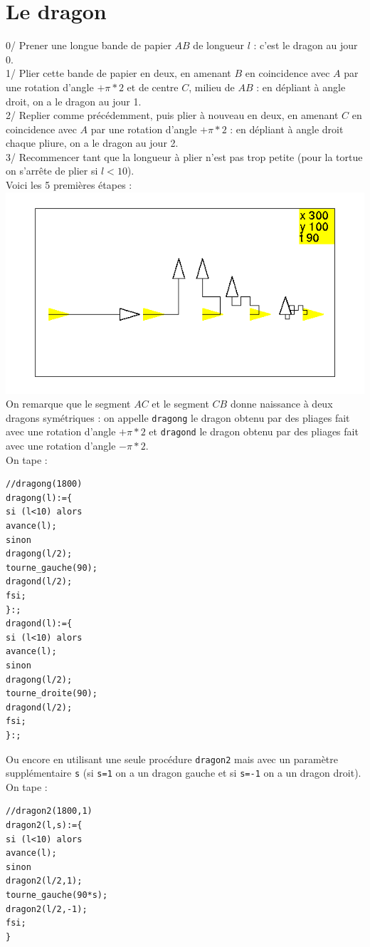 \documentclass[a4paper,11pt]{book}
\begin{document}
\section{Le dragon}
0/ Prener une longue bande de papier $AB$ de longueur $l$ : c'est le dragon au 
jour 0.\\
1/ Plier cette bande de papier en deux, en amenant $B$
en coincidence avec $A$ par une rotation d'angle $+\pi*2$ et de centre $C$,
 milieu de $AB$ : en d\'epliant \`a angle droit, on a le dragon au jour 1.\\
2/ Replier comme pr\'ec\'edemment, puis plier \`a nouveau en deux, en amenant 
$C$ en coincidence avec $A$ par une rotation d'angle $+\pi*2$ : en d\'epliant 
\`a angle droit chaque pliure, on a le dragon au jour 2.\\
3/ Recommencer tant que la longueur \`a plier n'est pas trop petite (pour la 
tortue on s'arr\^ete de plier si $l<10$).\\
Voici les 5 premi\`eres \'etapes :\\
%
\includegraphics[width=\textwidth]{tortdrag}\\

On remarque que le segment $AC$ et le segment $CB$ donne naissance \`a deux 
dragons sym\'etriques : on appelle {\tt dragong} le dragon obtenu par des 
pliages fait avec une rotation d'angle $+\pi*2$ et {\tt dragond} le dragon 
obtenu par des pliages fait avec une rotation d'angle $-\pi*2$.\\
On tape : 
\begin{verbatim}
//dragong(1800)
dragong(l):={
si (l<10) alors
avance(l);
sinon
dragong(l/2);
tourne_gauche(90);
dragond(l/2);
fsi;
}:;
dragond(l):={
si (l<10) alors
avance(l);
sinon
dragong(l/2);
tourne_droite(90);
dragond(l/2);
fsi;
}:;
\end{verbatim}
Ou encore en utilisant une seule proc\'edure {\tt dragon2} mais avec un 
param\`etre suppl\'ementaire {\tt s} (si {\tt s=1} on a un dragon gauche et 
si {\tt s=-1} on a un dragon droit).\\
On tape :
\begin{verbatim}
//dragon2(1800,1)
dragon2(l,s):={
si (l<10) alors
avance(l);
sinon
dragon2(l/2,1);
tourne_gauche(90*s);
dragon2(l/2,-1);
fsi;
}
\end{verbatim}
\end{document}

